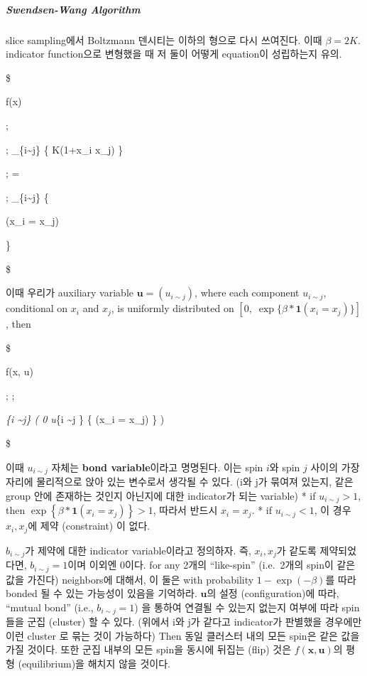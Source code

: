 \documentclass[
]{book}
\begin{document}
\hypertarget{swendsen-wang-algorithm}{%
\subparagraph{Swendsen-Wang Algorithm}\label{swendsen-wang-algorithm}}

slice sampling에서 Boltzmann 덴시티는 이하의 형으로 다시 쓰여진다. 이때 \(\beta = 2K\). indicator function으로 변형했을 때 저 둘이 어떻게 equation이 성립하는지 유의.

\$

f(\pmb x)

; \propto 

; \prod\_\{i\sim j\} \exp \left\{ K(1+x\_i x\_j) \right\}

; =

; \prod\_\{i\sim j\} \exp \left\{ \beta \ast 

(x\_i = x\_j)

\right\}

\$

이때 우리가 auxiliary variable \(\pmb u = (u_{i \sim j})\), where each component \(u_{i \sim j}\), conditional on \(x_i\) and \(x_j\), is uniformly distributed on \(\left[ 0, \; \exp \{\beta \ast \mathbf{1}(x_i = x_j)\} \right]\), then

\$

f(\pmb x, \pmb u)

; \propto  ;

\prod\emph{\{i \sim j\}  \left( 0 \le u}\{i \sim j \} \le \exp\left\{ \beta \ast {} (x\_i = x\_j) \right\} \right)

\$

이때 \(u_{i \sim j}\) 자체는 \textbf{bond variable}이라고 명명된다. 이는 spin \(i\)와 spin \(j\) 사이의 가장자리에 물리적으로 앉아 있는 변수로서 생각될 수 있다. (i와 j가 묶여져 있는지, 같은 group 안에 존재하는 것인지 아닌지에 대한 indicator가 되는 variable)
* if \(u_{i \sim j}>1\), then \(\exp \left\{ \beta \ast \mathbf{1}(x_i = x_j) \right \}>1\), 따라서 반드시 \(x_i = x_j\).
* if \(u_{i \sim j}<1\), 이 경우 \(x_i, x_j\)에 제약 (constraint) 이 없다.

\(b_{i \sim j}\)가 제약에 대한 indicator variable이라고 정의하자. 즉, \(x_i, x_j\)가 같도록 제약되었다면, \(b_{i \sim j}=1\)이며 이외엔 0이다. for any 2개의 ``like-spin'' (i.e.~2개의 spin이 같은 값을 가진다) neighbors에 대해서, 이 둘은 with probability \(1-\exp (-\beta)\)를 따라 bonded 될 수 있는 가능성이 있음을 기억하라. \(\pmb u\)의 설정 (configuration)에 따라, ``mutual bond'' (i.e., \(b_{i \sim j}=1\)) 을 통하여 연결될 수 있는지 없는지 여부에 따라 spin들을 군집 (cluster) 할 수 있다. (위에서 i와 j가 같다고 indicator가 판별했을 경우에만 이런 cluster 로 묶는 것이 가능하다) Then 동일 클러스터 내의 모든 spin은 같은 값을 가질 것이다. 또한 군집 내부의 모든 spin을 동시에 뒤집는 (flip) 것은 \(f(\pmb x , \pmb u)\)의 평형 (equilibrium)을 해치지 않을 것이다.
\end{document}
